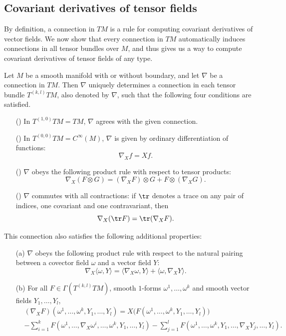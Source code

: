 \subsection{Covariant derivatives of tensor fields}
By definition, a connection in $TM$ is a rule for computing covariant derivatives of vector fields. We now show that every connection in $TM$ automatically 
induces connections in all tensor bundles over $M$, and thus gives us a way to compute covariant derivatives of tensor fields of any type.
\begin{proposition}\label{connection def on tensor}
Let $M$ be a smooth manifold with or without boundary, and let $\nabla$ be a connection in 
$TM$. Then $\nabla$ uniquely determines a connection in each tensor bundle $T^{(k,l)}TM$, 
also denoted by $\nabla$, such that the following four conditions are satisfied.
\begin{itemize}
\item[(\rmnum{1})] In $T^{(1,0)}TM=TM$, $\nabla$ agrees with the given connection.
\item[(\rmnum{2})] In $T^{(0,0)}TM=C^{\infty}(M)$, $\nabla$ is given by ordinary differentiation 
of functions:
\[\nabla_Xf=Xf.\]
\item[(\rmnum{3})] $\nabla$ obeys the following product rule with respect to tensor 
products:
\[\nabla_X(F\otimes G)=(\nabla_XF)\otimes G+F\otimes(\nabla_XG).\]
\item[(\rmnum{4})] $\nabla$ commutes with all contractions: if $\tr$ denotes a trace on any 
pair of indices, one covariant and one contravariant, then
\[\nabla_X(\tr F)=\tr(\nabla_XF).\]
\end{itemize}
This connection also satisfies the following additional properties:
\begin{itemize}
\item[(a)] $\nabla$ obeys the following product rule with respect to the natural pairing 
between a covector field $\omega$ and a vector field $Y$:
\[\nabla_X\langle\omega,Y\rangle=\langle\nabla_X\omega,Y\rangle+\langle\omega,\nabla_XY\rangle.\]
\item[(b)] For all $F\in\Gamma(T^{(k,l)}TM)$, smooth $1$-forms $\omega^1,\dots,\omega^k$ and 
smooth vector fields $Y_1,\dots,Y_l$,
\begin{equation}\label{connection def on tensor-1}
\begin{aligned}
&(\nabla_XF)(\omega^1,\dots,\omega^k,Y_1,\dots,Y_l)=X\big(F(\omega^1,\dots,\omega^k,Y_1,\dots,Y_l)\big)\\
&-\sum_{i=1}^{k}F(\omega^1,\dots,\nabla_X\omega^i,\dots,\omega^k,Y_1,\dots,Y_l)-\sum_{j=1}^{l}F(\omega^1,\dots,\omega^k,Y_1,\dots,\nabla_XY_j,\dots,Y_l).
\end{aligned}
\end{equation}
\end{itemize}
\end{proposition}
